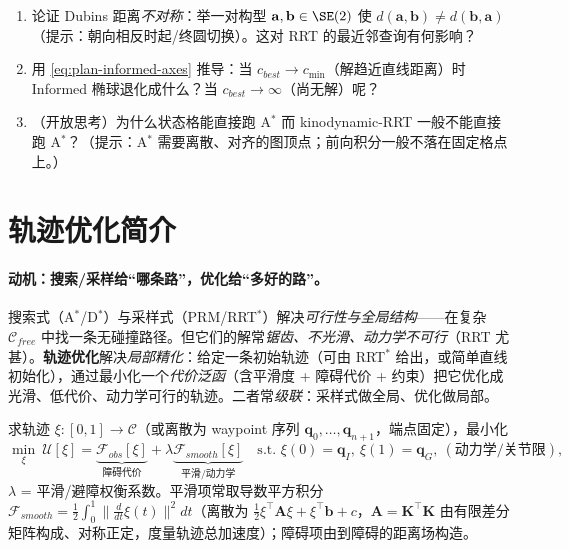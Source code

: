 \begin{practice}
\begin{enumerate}
  \item 论证 Dubins 距离\emph{不对称}：举一对构型 $\mathbf{a},\mathbf{b}\in\SE(2)$ 使 $d(\mathbf{a},\mathbf{b})\ne d(\mathbf{b},\mathbf{a})$（提示：朝向相反时起/终圆切换）。这对 RRT 的最近邻查询有何影响？
  \item 用 \cref{eq:plan-informed-axes} 推导：当 $c_{best}\to c_{\min}$（解趋近直线距离）时 Informed 椭球退化成什么？当 $c_{best}\to\infty$（尚无解）呢？
  \item （开放思考）为什么状态格能直接跑 A$^*$ 而 kinodynamic-RRT 一般不能直接跑 A$^*$？（提示：A$^*$ 需要离散、对齐的图顶点；前向积分一般不落在固定格点上。）
\end{enumerate}
\end{practice}

\section{轨迹优化简介}
\label{sec:plan-traj}

\paragraph{动机：搜索/采样给“哪条路”，优化给“多好的路”。}
搜索式（A$^*$/D$^*$）与采样式（PRM/RRT$^*$）解决\emph{可行性与全局结构}——在复杂 $\mathcal{C}_{free}$ 中找一条无碰撞路径。但它们的解常\emph{锯齿、不光滑、动力学不可行}（RRT 尤甚）。\textbf{轨迹优化}解决\emph{局部精化}：给定一条初始轨迹（可由 RRT$^*$ 给出，或简单直线初始化），通过最小化一个\emph{代价泛函}（含平滑度 + 障碍代价 + 约束）把它优化成光滑、低代价、动力学可行的轨迹。二者常\emph{级联}：采样式做全局、优化做局部。

\begin{definition}[轨迹优化的一般形式]\label{def:plan-trajopt}
求轨迹 $\xi:[0,1]\to\mathcal{C}$（或离散为 waypoint 序列 $\mathbf{q}_0,\dots,\mathbf{q}_{n+1}$，端点固定），最小化
\begin{equation}
  \min_{\xi}\ \mathcal{U}[\xi]=\underbrace{\mathcal{F}_{obs}[\xi]}_{\text{障碍代价}}+\lambda\underbrace{\mathcal{F}_{smooth}[\xi]}_{\text{平滑/动力学}}\quad\text{s.t. }\xi(0)=\mathbf{q}_I,\ \xi(1)=\mathbf{q}_G,\ (\text{动力学/关节限}),
  \label{eq:plan-trajopt}
\end{equation}
$\lambda$ = 平滑/避障权衡系数。平滑项常取导数平方积分 $\mathcal{F}_{smooth}=\tfrac12\int_0^1\|\tfrac{d}{dt}\xi(t)\|^2dt$（离散为 $\tfrac12\xi^\top\mathbf{A}\xi+\xi^\top\mathbf{b}+c$，$\mathbf{A}=\mathbf{K}^\top\mathbf{K}$ 由有限差分矩阵构成、对称正定，度量轨迹总加速度）；障碍项由到障碍的距离场构造。
\end{definition}


